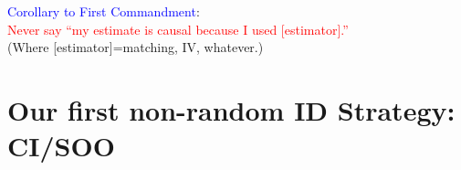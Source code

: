 \documentclass[xcolor=dvipsnames]{beamer}
\begin{document}
\begin{frame}
\begin{center}
 \textcolor{Blue}{Corollary to First Commandment}: \\
 \textcolor{Red}{Never say ``my estimate is causal because I used [estimator].''} \\ \footnotesize (Where [estimator]=matching, IV, whatever.)
\end{center}
\end{frame}

%

\section{Our first non-random ID Strategy: CI/SOO}
\end{document}
